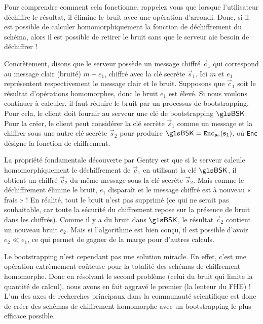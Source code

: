 Pour comprendre comment cela fonctionne, rappelez vous que lorsque l'utilisateur déchiffre le résultat, il élimine le bruit avec une opération d'arrondi. Donc, si il est possible de calculer homomorphiquement la fonction de déchiffrement du schéma, alors il est possible de retirer le bruit sans que le serveur aie besoin de déchiffrer ! 

Concrètement, disons que le serveur possède un message chiffré $\vec c_1$ qui correspond au message clair (bruité) $m + e_1$, chiffré avec la clé secrète $\vec s_1$. Ici $m$ et $e_1$ représentent respectivement le message clair et le bruit. Supposons que $\vec c_1$ soit le résultat d’opérations homomorphes, donc le bruit $e_1$ est élevé. Si nous voulons continuer à calculer, il faut réduire le bruit par un processus de bootstrapping.
Pour cela, le client doit fournir au serveur une clé de bootstrapping $\BSK$. Pour la créer, le client peut considérer la clé secrète $\vec s_1$ comme un message et la chiffrer sous une autre clé secrète $\vec s_2$ pour produire $\BSK = \texttt{Enc}_{\vec s_2}(\vec s_1)$, où \texttt{Enc} désigne la fonction de chiffrement.

La propriété fondamentale découverte par Gentry est que si le serveur calcule homomorphiquement le déchiffrement de $\vec c_1$ en utilisant la clé $\BSK$, il obtient un chiffré $\vec c_2$ du même message sous la clé secrète $\vec s_2$. Mais comme le déchiffrement élimine le bruit, $e_1$ disparaît et le message chiffré est à nouveau « frais » !
En réalité, tout le bruit n’est pas supprimé (ce qui ne serait pas souhaitable, car toute la sécurité du chiffrement repose sur la présence de bruit dans les chiffrés). Comme il y a du bruit dans $\BSK$, le résultat $\vec c_2$ contient un nouveau bruit $e_2$. Mais si l'algorithme est bien conçu, il est possible d’avoir $e_2 \ll e_1$, ce qui permet de gagner de la marge pour d’autres calculs.


Le bootstrapping n'est cependant pas une solution miracle. En effet, c'est une opération extrèmement coûteuse pour la totalité des schémas de chiffrement homomorphe. Donc en résolvant le second problème (celui du bruit qui limite la quantité de calcul), nous avons en fait aggravé le premier (la lenteur du \gls{FHE}) ! L'un des axes de recherches principaux dans la communauté scientifique est donc de créer des schémas de chiffrement homomorphe avec un bootstrapping le plus efficace possible. 



